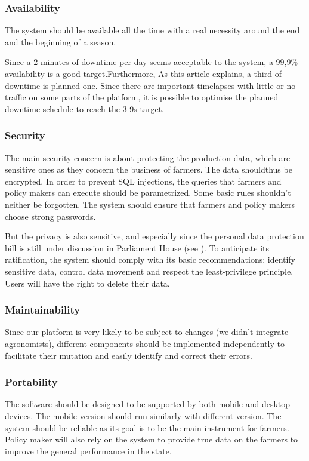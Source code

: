 \subsubsection{Availability}
The system should be available all the time with a real necessity around the end and the beginning of a season.

Since a 2 minutes of downtime per day seems acceptable to the system, a 99,9\% availability is a good target.Furthermore, As this article \cite{downtime} explains, a third of downtime is planned one. Since there are important timelapses with little or no traffic on some parts of the platform, it is possible to optimise the planned downtime schedule to reach the 3 9s target.
\subsubsection{Security}
The main security concern is about protecting the production data, which are sensitive ones as they concern the business of farmers. The data shouldthus be encrypted. In order to prevent SQL injections, the queries that farmers and policy makers can execute should be parametrized. Some basic rules shouldn't neither be forgotten. The system should ensure that farmers and policy makers choose strong passwords.  

But the privacy is also sensitive, and especially since the personal data protection bill is still under discussion in Parliament House (see \cite{pdp}). To anticipate its ratification, the system should comply with its basic recommendations: identify sensitive data, control data movement and respect the least-privilege principle. Users will have the right to delete their data. 

\subsubsection{Maintainability}
Since our platform is very likely to be subject to changes (we didn't integrate agronomists), different components should be implemented independently to facilitate their mutation and easily identify and correct their errors.
\subsubsection{Portability}
The software should be designed to be supported by both mobile and desktop devices. The mobile version should run similarly with different version.
The system should be reliable as its goal is to be the main instrument for farmers. Policy maker will also rely on the system to provide true data on the farmers to improve the general performance in the state.

